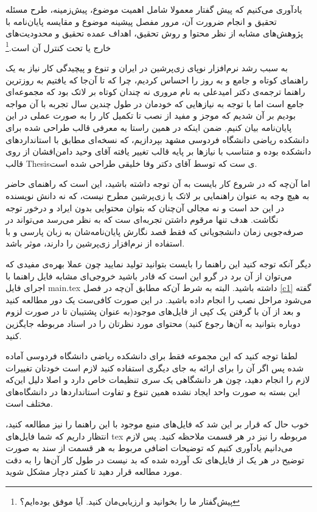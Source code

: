 \begin{preface}[مقدمه]
یادآوری می‌کنیم که پیش گفتار معمولا شامل اهمیت موضوع، پیش‌زمینه، طرح مسئله تحقیق و انجام ضرورت آن، مرور مفصل پیشینه موضوع و مقایسه پایان‌نامه با پژوهش‌های مشابه از نظر محتوا و روش تحقیق، اهداف عمده تحقیق و محدودیت‌های خارج یا تحت کنترل آن است.\footnote{پیش‌گفتار ما را بخوانید و ارزیابی‌مان کنید. آیا موفق بوده‌ایم؟}

به سبب رشد نرم‌افزار نوپای زی‌پرشین\LTRfootnote{\XePersian} در ایران و تنوع و پیچیدگی کار نیاز به یک راهنمای کوتاه و جامع و به روز را احساس کردیم، چرا که تا آن‌جا که یافتیم به روزترین راهنما ترجمه‌ی دکتر امیدعلی به نام مروری نه چندان کوتاه بر لاتک بود که مجموعه‌ای جامع است اما با توجه به نیازهایی که خودمان در طول چندین سال تجربه با آن مواجه بودیم بر آن شدیم که موجز و مفید از نصب تا تکمیل کار را به صورت عملی در این پایان‌نامه بیان کنیم. ضمن اینکه در همین راستا به معرفی قالب طراحی شده برای دانشکده ریاضی دانشگاه فردوسی مشهد بپردازیم، که نسخه‌ای مطابق با استانداردهای دانشکده بوده و متناسب با نیازها بر پایه قالب تغییر یافته آقای وحید دامن‌افشان از روی قالب Thesisی ست که توسط آقای دکتر وفا خلیقی طراحی شده است.



اما آن‌چه که در شروع کار بایست به آن توجه داشته باشید، این است که راهنمای حاضر به هیچ وجه به عنوان راهنمایی بر لاتک یا زی‌پرشین مطرح نیست، که نه دانش نویسنده در این حد است و نه مجالی آن‌چنان که بتوان محتوایی بدون ایراد و درخور توجه نگاشت. هدف تنها مرقوم داشتن تجربه‌ای ست که به نظر می‌رسد می‌تواند در صرفه‌جویی زمان دانشجویانی که فقط قصد نگارش پایان‌نامه‌شان به زبان پارسی و با استفاده از نرم‌افزار زی‌پرشین را دارند، موثر باشد.


دیگر آنکه توجه کنید این راهنما را بایست بتوانید تولید نمایید چون عملا بهره‌ی مفیدی که می‌توان از آن برد در گرو این است که قادر باشید خروجی‌ای مشابه فایل راهنما با اجرای فایل main.tex داشته باشید. البته به شرط آن‌که مطابق آن‌چه در فصل \ref{c1} گفته می‌شود مراحل نصب را انجام داده باشید. در این صورت کافی‌ست یک دور مطالعه کنید و بعد از آن با گرفتن یک کپی از فایل‌های موجود(به عنوان پشتیبان تا در صورت لزوم دوباره بتوانید به آن‌ها رجوع کنید) محتوای مورد نظرتان را در اسناد مربوطه جایگزین کنید.


لطفا توجه کنید که این مجموعه فقط برای دانشکده ریاضی دانشگاه فردوسی آماده شده پس اگر آن را برای ارائه به جای دیگری استفاده کنید لازم است خودتان تغییرات لازم را انجام دهید، چون هر دانشگاهی یک سری تنظیمات خاص دارد و اصلا دلیل این‌که این بسته به صورت واحد ایجاد نشده همین تنوع و تفاوت استانداردها در دانشگاه‌های مختلف است.

خوب حال که قرار بر این شد که فایل‌های منبع موجود با این راهنما را نیز مطالعه کنید، انتظار داریم که شما فایل‌های tex مربوطه را نیز در هر قسمت ملاحظه کنید. پس لازم می‌دانیم یادآوری کنیم که توضیحات اضافی مربوط به هر قسمت از سند به صورت توضیح در هر یک از فایل‌های تک آورده شده که بد نیست در طول کار آن‌ها را به دقت مورد مطالعه قرار دهید تا کمتر دچار مشکل شوید.


\end{preface}
